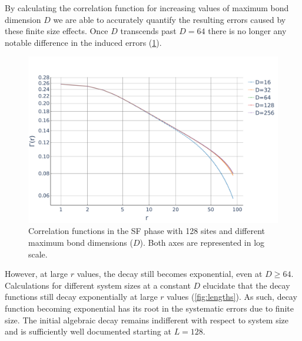 \documentclass[twoside,twocolumn,9pt]{article}
\begin{document}
By calculating the correlation function for increasing values of maximum bond dimension $D$ we are able to accurately quantify the resulting errors caused by these finite size effects. Once $D$ transcends past $D=64$ there is no longer any notable difference in the induced errors (\cref{fig:bonds}). 
\begin{center}
  \begin{figure}
      \includegraphics[width=\linewidth]{../code/figures/Correlations-bonds.pdf}
      \caption{Correlation functions in the SF phase with 128 sites and different maximum bond dimensions ($D$). Both axes are represented in log scale.}
      \label{fig:bonds}
  \end{figure}
\end{center}
However, at large $r$ values, the decay still becomes exponential, even at $D\ge64$. Calculations for different system sizes at a constant $D$ elucidate that the decay functions still decay exponentially at large $r$ values (\cref{fig:lengths}). As such, decay function becoming exponential has its root in the systematic errors due to finite size. The initial algebraic decay remains indifferent with respect to system size and is sufficiently well documented starting at $L=128$.
\end{document}
